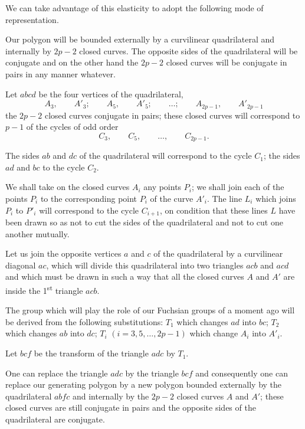 \documentclass{article}
\begin{document}
We can take advantage of this elasticity to adopt the following mode of representation.

Our polygon will be bounded externally by a curvilinear quadrilateral and internally by $2p - 2$ closed curves. The opposite sides of the quadrilateral will be conjugate and on the other hand the $2p - 2$ closed curves will be conjugate in pairs in any manner whatever.

Let $abcd$ be the four vertices of the quadrilateral,
\[ A_{3}, \qquad A'_{3}; \qquad A_{5}, \qquad A'_{5}; \qquad \ldots; \qquad A_{2p-1}, \qquad A'_{2p-1} \]
the $2p - 2$ closed curves conjugate in pairs; these closed curves will correspond to $p - 1$ of the cycles of odd order
\[ C_{3}, \qquad C_{5}, \qquad \ldots, \qquad C_{2p-1}. \]

The sides $ab$ and $dc$ of the quadrilateral will correspond to the cycle $C_{1}$; the sides $ad$ and $bc$ to the cycle $C_{2}$.

We shall take on the closed curves $A_{i}$ any points $P_{i}$; we shall join each of the points $P_{i}$ to the corresponding point $P_{i}$ of the curve $A'_{i}$. The line $L_{i}$ which joins $P_{i}$ to $P'_{i}$ will correspond to the cycle $C_{i+1}$, on condition that these lines $L$ have been drawn so as not to cut the sides of the quadrilateral and not to cut one another mutually.

Let us join the opposite vertices $a$ and $c$ of the quadrilateral by a curvilinear diagonal $ac$, which will divide this quadrilateral into two triangles $acb$ and $acd$ and which must be drawn in such a way that all the closed curves $A$ and $A'$ are inside the 1\textsuperscript{st} triangle $acb$.

The group which will play the role of our Fuchsian groups of a moment ago will be derived from the following substitutions: $T_{1}$ which changes $ad$ into $bc$; $T_{2}$ which changes $ab$ into $dc$; $T_{i}$ $(i = 3, 5, \ldots, 2p - 1)$ which change $A_{i}$ into $A'_{i}$.

Let $bcf$ be the transform of the triangle $adc$ by $T_{1}$.

One can replace the triangle $adc$ by the triangle $bcf$ and consequently one can replace our generating polygon by a new polygon bounded externally by the quadrilateral $abfc$ and internally by the $2p - 2$ closed curves $A$ and $A'$; these closed curves are still conjugate in pairs and the opposite sides of the quadrilateral are conjugate.
\end{document}
